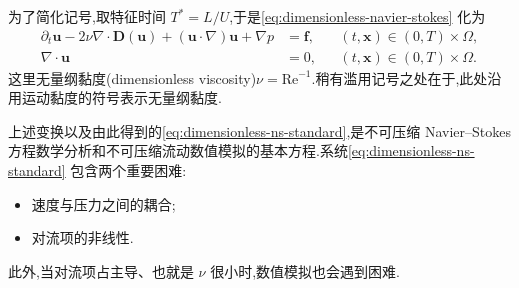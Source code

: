 \begin{note}\label{note:dimensionless-difficulties}
为了简化记号,取特征时间 $T^*=L/U$,于是\cref{eq:dimensionless-navier-stokes} 化为
\begin{equation}\label{eq:dimensionless-ns-standard}
\begin{aligned}
  \partial_t\bm{u}-2\nu\nabla\cdot\bm{D}(\bm{u})
    +(\bm{u}\cdot\nabla)\bm{u}+\nabla p
  &=\bm{f},
  &&(t,\bm{x})\in(0,T)\times\Omega,\\
  \nabla\cdot\bm{u}&=0,
  &&(t,\bm{x})\in(0,T)\times\Omega.
\end{aligned}
\end{equation}
这里无量纲黏度(dimensionless viscosity)$\nu=\mathrm{Re}^{-1}$.稍有滥用记号之处在于,此处沿用运动黏度的符号表示无量纲黏度.

上述变换以及由此得到的\cref{eq:dimensionless-ns-standard},是不可压缩 Navier--Stokes 方程数学分析和不可压缩流动数值模拟的基本方程.系统\cref{eq:dimensionless-ns-standard} 包含两个重要困难:
\begin{itemize}
  \item 速度与压力之间的耦合;
  \item 对流项的非线性.
\end{itemize}
此外,当对流项占主导、也就是 $\nu$ 很小时,数值模拟也会遇到困难.
\end{note}

